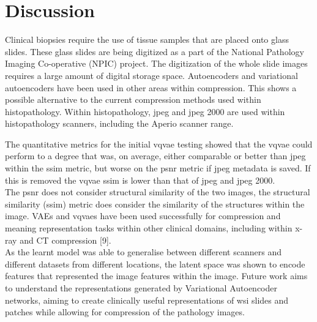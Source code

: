 \documentclass[review]{elsarticle}
\begin{document}
\section{Discussion}
Clinical biopsies require the use of tissue samples that are placed onto glass slides. These glass slides are being digitized as a part of the National Pathology Imaging Co-operative (NPIC) project. The digitization of the whole slide images requires a large amount of digital storage space. Autoencoders and variational autoencoders have been used in other areas within compression. This shows a possible alternative to the current compression methods used within histopathology. Within histopathology, \gls{jpeg} and \gls{jpeg} 2000 are used within histopathology scanners, including the Aperio scanner range.


The quantitative metrics for the initial \gls{vqvae} testing showed that the \gls{vqvae} could perform to a degree that was, on average, either comparable or better than \gls{jpeg} within the \gls{ssim} metric, but worse on the \gls{psnr} metric if \gls{jpeg} metadata is saved. If this is removed the \gls{vqvae} \gls{ssim} is lower than that of \gls{jpeg} and \gls{jpeg} 2000. \\
The \gls{psnr} does not consider structural similarity of the two images, the structural similarity (\gls{ssim}) metric does consider the similarity of the structures within the image. 
VAEs and \gls{vqvae}s have been used successfully for compression and meaning representation tasks within other clinical domains, including within x-ray and CT compression [9]. \\
As the learnt model was able to generalise between different scanners and different datasets from different locations, the latent space was shown to encode features that represented the image features within the image. Future work aims to understand the representations generated by Variational Autoencoder networks, aiming to create clinically useful representations of \gls{wsi} slides and patches while allowing for compression of the pathology images. 
\end{document}
